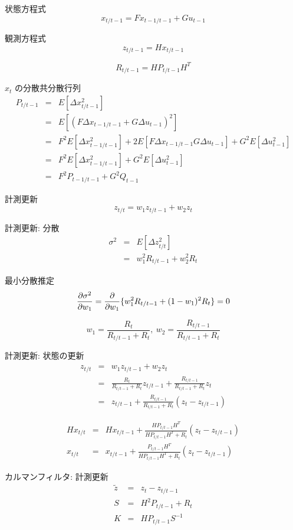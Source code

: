 \documentclass{jarticle}
\begin{document}
状態方程式
$$
x_{t/t-1} = Fx_{t-1/t-1} + Gu_{t-1}
$$

観測方程式
$$
z_{t/t-1} = Hx_{t/t-1}
$$

$$
R_{t/t-1} = H P_{t/t-1} H^T
$$

$x_{t}$ の分散共分散行列
\begin{eqnarray}
P_{t/t-1}
&=& E[\Delta x^2_{t/t-1}] \nonumber \\
&=& E[(F\Delta x_{t-1/t-1} + G\Delta u_{t-1})^2] \nonumber \\
&=& F^2 E[\Delta x_{t-1/t-1}^2] + 2 E[F \Delta x_{t-1/t-1} G \Delta u_{t-1}] + G^2 E[\Delta u_{t-1}^2] \nonumber \\
&=& F^2 E[\Delta x_{t-1/t-1}^2] + G^2 E[\Delta u_{t-1}^2] \nonumber \\
&=& F^2 P_{t-1/t-1} + G^2 Q_{t-1} \nonumber
\end{eqnarray}

計測更新
$$
z_{t/t} = w_{1} z_{t/t-1} + w_{2} z_{t}
$$

計測更新: 分散
\begin{eqnarray}
\sigma^2
&=& E[\Delta z_{t/t}^2] \nonumber \\
&=& w_{1}^2 R_{t/t-1} + w_{2}^2 R_{t} \nonumber
\end{eqnarray}

最小分散推定
$$
\frac{\partial \sigma^2}{\partial w_{1}} = \frac{\partial }{\partial w_{1}} \{ w_{1}^2 R_{t/t-1} + (1 - w_{1})^2 R_{t} \} = 0 \nonumber \\
$$

$$
w_{1} = \frac{R_{t}}{R_{t/t-1} + R_{t}},\ w_{2} = \frac{R_{t/t-1}}{R_{t/t-1} + R_{t}}
$$

計測更新: 状態の更新
\begin{eqnarray}
z_{t/t}
&=& w_{1} z_{t/t-1} + w_{2} z_{t} \nonumber \\
&=& \frac{R_{t}}{R_{t/t-1} + R_{t}} z_{t/t-1} + \frac{R_{t/t-1}}{R_{t/t-1} + R_{t}} z_{t} \nonumber \\
&=& z_{t/t-1} + \frac{R_{t/t-1}}{R_{t/t-1} + R_{t}} (z_{t} - z_{t/t-1}) \nonumber
\end{eqnarray}

\begin{eqnarray}
H x_{t/t} &=& H x_{t/t-1} + \frac{H P_{t/t-1} H^T}{H P_{t/t-1} H^T + R_{t}} (z_{t} - z_{t/t-1}) \nonumber \\
x_{t/t} &=& x_{t/t-1} + \frac{P_{t/t-1} H^T}{H P_{t/t-1} H^T + R_{t}} (z_{t} - z_{t/t-1}) \nonumber
\end{eqnarray}

カルマンフィルタ: 計測更新
\begin{eqnarray}
\tilde{z} &=& z_{t} - z_{t/t-1} \nonumber \\
S &=& H^2 P_{t/t-1} + R_{t} \nonumber \\
K &=& H P_{t/t-1} S^{-1} \nonumber
\end{eqnarray}
\end{document}

